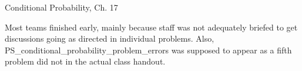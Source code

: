 \documentclass[handout]{mcs}
\begin{document}

\begin{staffnotes}
Conditional Probability, Ch. 17

Most teams finished early, mainly because staff was not adequately
briefed to get discussions going as directed in individual problems.
Also, PS_conditional_probability_problem_errors was supposed to appear
as a fifth problem did not in the actual class handout.
\end{staffnotes}











\end{document}
